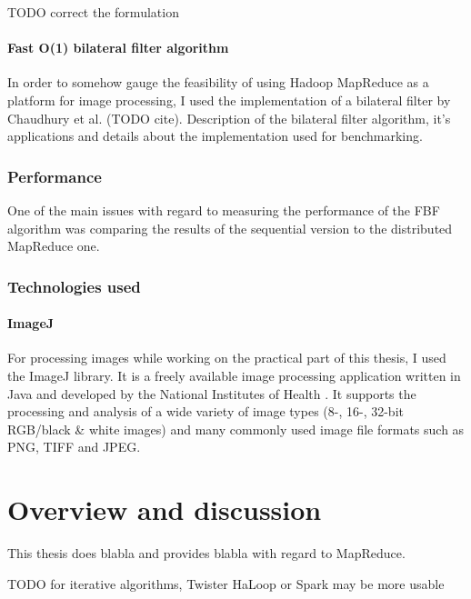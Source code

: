 \documentclass [12pt,a4paper]{report}
\begin{document}
\begin{center}
\begin{algorithm}[H]
\end{algorithm}
\end{center}

TODO correct the formulation


\subsubsection{Fast O(1) bilateral filter algorithm}

In order to somehow gauge the feasibility of using Hadoop MapReduce as a platform for image processing, I used the implementation of a bilateral filter by Chaudhury et al. (TODO cite).
Description of the bilateral filter algorithm, it's applications and details about the implementation used for benchmarking.

\subsection{Performance}

One of the main issues with regard to measuring the performance of the FBF algorithm was comparing the results of the sequential version to the distributed MapReduce one.

\subsection{Technologies used}

\subsubsection{ImageJ}
For processing images while working on the practical part of this thesis, I used the ImageJ library. It is a freely available image processing application written in Java and developed by the National Institutes of Health \cite{imagej}. It supports the processing and analysis of a wide variety of image types (8-, 16-, 32-bit RGB/black \& white images) and many commonly used image file formats such as PNG, TIFF and JPEG.



\chapter{Overview and discussion}

This thesis does blabla and provides blabla with regard to MapReduce. 

TODO for iterative algorithms, Twister HaLoop or Spark may be more usable

\clearpage
{}


\end{document}
